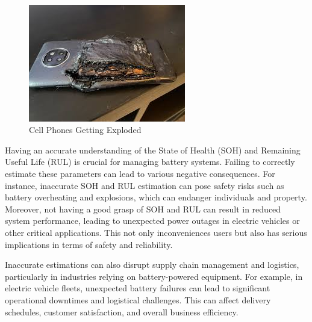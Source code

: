 \begin{figure}[h!]
\begin{minipage}[b]{0.45\textwidth}
    \end{minipage}
    \\
    \vspace{0.8cm} %
    \begin{minipage}[b]{0.45\textwidth}
        \centering
        \includegraphics[width=\textwidth]{consequences_image2.jpg} %
        \caption{Cell Phones Getting Exploded}
        \label{fig:another2}
    \end{minipage}
\end{figure}

Having an accurate understanding of the State of Health (SOH) and Remaining Useful Life (RUL) is crucial for managing battery systems. Failing to correctly estimate these parameters can lead to various negative consequences. For instance, inaccurate SOH and RUL estimation can pose safety risks such as battery overheating and explosions, which can endanger individuals and property. Moreover, not having a good grasp of SOH and RUL can result in reduced system performance, leading to unexpected power outages in electric vehicles or other critical applications. This not only inconveniences users but also has serious implications in terms of safety and reliability.

Inaccurate estimations can also disrupt supply chain management and logistics, particularly in industries relying on battery-powered equipment. For example, in electric vehicle fleets, unexpected battery failures can lead to significant operational downtimes and logistical challenges. This can affect delivery schedules, customer satisfaction, and overall business efficiency.

